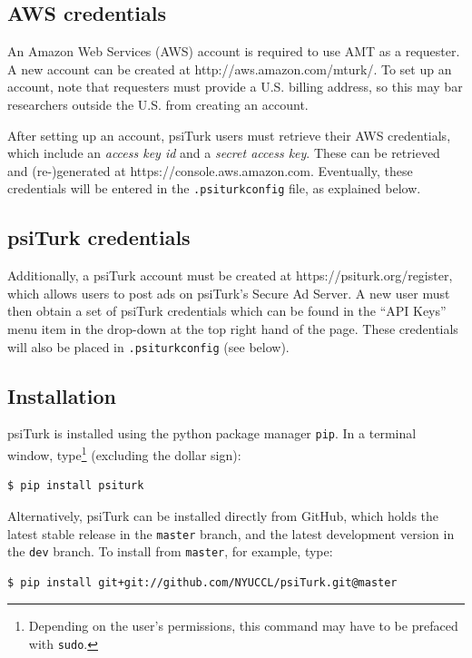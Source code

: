 \documentclass[twocolumn]{svjour3}          %
\newcommand{\psiturk}[0]{\textsf{psiTurk}}
\begin{document}
\subsection{AWS credentials}
An Amazon Web Services (AWS) account is required to use AMT as a requester. A new account can be created at \textsf{http://aws.amazon.com/mturk/}. 
To set up an account, note that requesters
must provide a U.S. billing address, so this may bar researchers outside the U.S. from creating an account. 

After setting up an account, \psiturk{} users must retrieve their AWS credentials, which include an \emph{access key id} and a
\emph{secret access key}. These can be retrieved and (re-)generated at \textsf{https://console.aws.amazon.com}.
Eventually, these credentials will be entered in the \texttt{.psiturkconfig} file, as explained below.


\subsection{\psiturk{} credentials}
Additionally, a \psiturk{} account must be created at \textsf{https://psiturk.org/register}, which allows users to 
post ads on \psiturk{}'s Secure Ad Server. A new user must then obtain a set of \psiturk{} credentials which can be found in 
the ``API Keys'' menu item in the drop-down at the top right hand of the page.
These credentials will also be placed in \texttt{.psiturkconfig} (see below).

\subsection{Installation}
\psiturk{} is installed using the python package manager \texttt{pip}. In a terminal window, type\footnote{Depending on the user's permissions, this command may have to be prefaced with \texttt{sudo}.} (excluding the dollar sign):

\begin{lstlisting}
$ pip install psiturk
\end{lstlisting}

Alternatively, \psiturk{} can be installed directly from GitHub, which holds the latest stable
release in the \texttt{master} branch, and the latest development version in the \texttt{dev} branch. 
To install from \texttt{master}, for example, type:

\begin{lstlisting}
$ pip install git+git://github.com/NYUCCL/psiTurk.git@master
\end{lstlisting}
\end{document}

